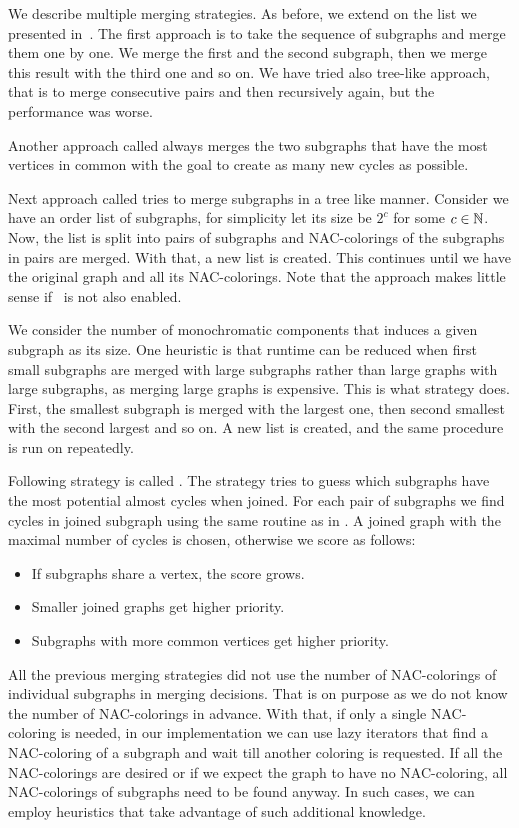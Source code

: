 We describe multiple merging strategies.
As before, we extend on the list we presented in~\cite{my_paper}.
The first approach \MergeLinear{} is
to take the sequence of subgraphs and merge them one by one.
We merge the first and the second subgraph, then we merge this result with the
third one and so on. We have tried also tree-like approach, that is to merge consecutive pairs
and then recursively again, but the performance was worse.

Another approach called \SharedVertices{} always merges the two subgraphs that
have the most vertices in common with the goal
to create as many new cycles as possible.

Next approach called \Log{} tries to merge subgraphs in a tree like manner.
Consider we have an order list of subgraphs,
for simplicity let its size be \( 2^c \) for some \( c \in \mathbb{N} \).
Now, the list is split into pairs of subgraphs and NAC-colorings
of the subgraphs in pairs are merged. With that, a new list is created.
This continues until we have the original graph and all its NAC-colorings.
Note that the approach makes little sense if~
is not also enabled.

We consider the number of monochromatic components
that induces a given subgraph as its size.
One heuristic is that runtime can be reduced
when first small subgraphs are merged with large subgraphs
rather than large graphs with large subgraphs, as merging large graphs is expensive.
This is what \MinMax{} strategy does.
First, the smallest subgraph is merged with the largest one,
then second smallest with the second largest and so on.
A new list is created, and the same procedure is run on repeatedly.

Following strategy is called \PromisingCycles{}.
The strategy tries to guess which subgraphs
have the most potential almost cycles when joined.
For each pair of subgraphs we find cycles in joined subgraph using
the same routine as in .
A joined graph with the maximal number of cycles is chosen,
otherwise we score as follows:
%
\begin{itemize}
	\item If subgraphs share a vertex, the score grows.
	\item Smaller joined graphs get higher priority.
	\item Subgraphs with more common vertices get higher priority.
\end{itemize}
%

All the previous merging strategies did not use the number of NAC-colorings
of individual subgraphs in merging decisions.
That is on purpose as we do not know the number of NAC-colorings in advance.
With that, if only a single NAC-coloring is needed,
in our implementation we can use lazy iterators that
find a NAC-coloring of a subgraph and wait till another coloring is requested.
If all the NAC-colorings are desired or if we expect the graph to have no NAC-coloring,
all NAC-colorings of subgraphs need to be found anyway.
In such cases, we can employ heuristics that take advantage of such additional knowledge.

